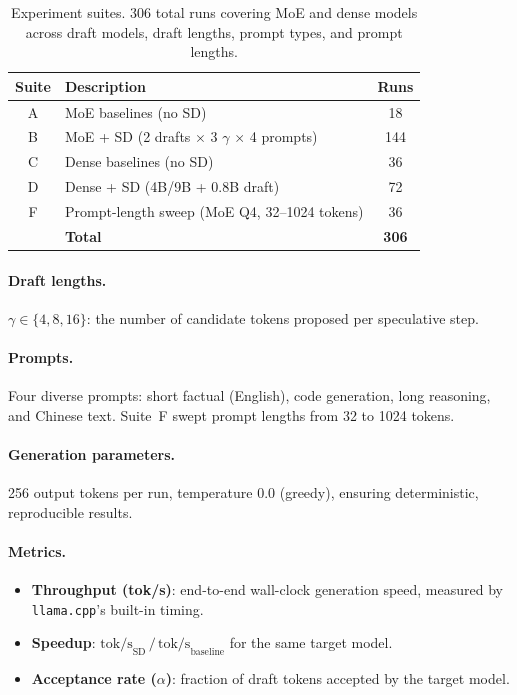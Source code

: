 \documentclass[11pt,a4paper]{article}
\begin{document}
\begin{table}[h]
\centering
\caption{Experiment suites. 306 total runs covering MoE and dense models across draft models, draft lengths, prompt types, and prompt lengths.}
\label{tab:suites}
\begin{tabular}{@{}clc@{}}
\toprule
\textbf{Suite} & \textbf{Description} & \textbf{Runs} \\
\midrule
A & MoE baselines (no SD) & 18 \\
B & MoE + SD (2 drafts $\times$ 3 $\gamma$ $\times$ 4 prompts) & 144 \\
C & Dense baselines (no SD) & 36 \\
D & Dense + SD (4B/9B + 0.8B draft) & 72 \\
F & Prompt-length sweep (MoE Q4, 32--1024 tokens) & 36 \\
\midrule
& \textbf{Total} & \textbf{306} \\
\bottomrule
\end{tabular}
\end{table}

\paragraph{Draft lengths.} $\gamma \in \{4, 8, 16\}$: the number of candidate tokens proposed per speculative step.

\paragraph{Prompts.} Four diverse prompts: short factual (English), code generation, long reasoning, and Chinese text. Suite~F swept prompt lengths from 32 to 1024 tokens.

\paragraph{Generation parameters.} 256 output tokens per run, temperature 0.0 (greedy), ensuring deterministic, reproducible results.

\paragraph{Metrics.}
\begin{itemize}[nosep,leftmargin=*]
  \item \textbf{Throughput (tok/s)}: end-to-end wall-clock generation speed, measured by \texttt{llama.cpp}'s built-in timing.
  \item \textbf{Speedup}: $\text{tok/s}_{\text{SD}} \,/\, \text{tok/s}_{\text{baseline}}$ for the same target model.
  \item \textbf{Acceptance rate ($\alpha$)}: fraction of draft tokens accepted by the target model.
\end{itemize}
\end{document}
